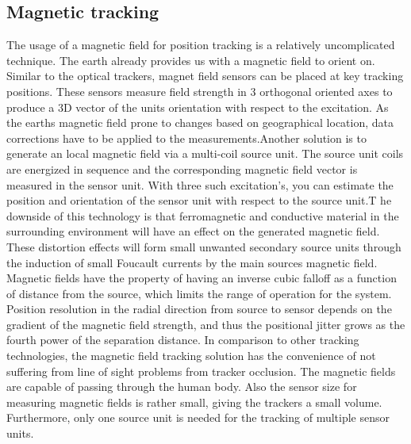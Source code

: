 \subsection{Magnetic tracking}
The usage of a magnetic field for position tracking is a relatively uncomplicated technique. The earth already provides us with a magnetic field to orient on. Similar to the optical trackers, magnet field sensors can be placed at key tracking positions. These sensors measure field strength in 3 orthogonal oriented axes to produce a 3D vector of the units orientation with respect to the excitation. As the earths magnetic field prone to changes based on geographical location, data corrections have to be applied to the measurements.Another solution is to generate an local magnetic field via a multi-coil source unit. The source unit coils are energized in sequence and the corresponding magnetic field vector is measured in the sensor unit. With three such excitation's, you can estimate the position and orientation of the sensor unit with respect to the source unit.T he downside of this technology is that ferromagnetic and conductive material in the surrounding environment will have an effect on the generated magnetic field. These distortion effects will form small unwanted secondary source units through the induction of small Foucault currents by the main sources magnetic field.
Magnetic fields have the property of having an inverse cubic falloff  as a function of distance from the source, which limits the range of operation for the system.
Position resolution in the radial direction from source to sensor depends on the gradient of the magnetic field strength, and thus the positional jitter grows as the fourth power of the separation distance.
In comparison to other tracking technologies, the magnetic field tracking solution has the convenience of not suffering from line of sight problems from tracker occlusion. The magnetic fields are capable of passing through the human body. Also the sensor size for measuring magnetic fields is rather small, giving the trackers a small volume. Furthermore, only one source unit is needed for the tracking of multiple sensor units.
